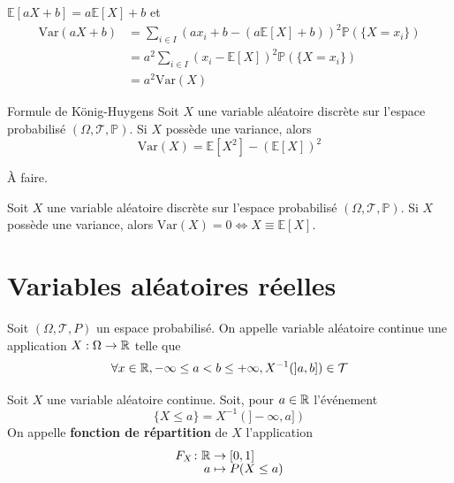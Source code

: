 \documentclass[a4paper,12pt]{article}
\begin{document}
\begin{demonstration}
    $\mathbb{E}[aX + b] = a \mathbb{E}[X] + b$ et
    \begin{align*}
        \mathrm{Var}(aX + b) &= \sum_{i \in I}\left( a x_i + b - (a \mathbb{E}[X] + b) \right)^2 \mathbb{P}(\{ X = x_i \}) \\
        &= a^2 \sum_{i \in I} (x_i - \mathbb{E}[X])^2 \mathbb{P}(\{ X = x_i \}) \\
        &= a^2 \mathrm{Var}(X) 
    \end{align*}
\end{demonstration}

\begin{proposition}{Formule de König-Huygens}{}
    Soit $X$ une variable aléatoire discrète sur l'espace probabilisé $(\Omega, \mathcal{T}, \mathbb{P})$.
    Si $X$ possède une variance, alors
    $$
    \mathrm{Var}(X) = \mathbb{E}[X^2] - (\mathbb{E}[X])^2
    $$
\end{proposition}

\begin{demonstration}
    À faire.
\end{demonstration}

\begin{proposition}{}{}
    Soit $X$ une variable aléatoire discrète sur l'espace probabilisé $(\Omega, \mathcal{T}, \mathbb{P})$.
    Si $X$ possède une variance, alors $\mathrm{Var}(X) = 0 \iff X \equiv \mathbb{E}[X]$.
\end{proposition}

\begin{demonstration}
\end{demonstration}

\clearpage

\section{Variables aléatoires réelles}

\begin{definition}
    Soit $(\Omega, \mathcal{T}, P)$ un espace probabilisé. On appelle variable aléatoire
    continue une application $X : \Omega \to \mathbb{R}$ telle que
    $$
    \forall x \in \mathbb{R}, -\infty \leq a < b \leq +\infty, X^{-1}(]a, b]) \in \mathcal{T}
    $$
\end{definition}

\begin{definition}
    Soit $X$ une variable aléatoire continue. Soit, pour $a \in \mathbb{R}$ l'événement
    $$
    \{X \leq a\} = X^{-1}(]-\infty, a])
    $$
    On appelle \textbf{fonction de répartition} de $X$ l'application
    $$
    \funcdef{F_X}{\R}{[0, 1]}{a}{P(X \leq a)}
    $$
\end{definition}
\end{document}
